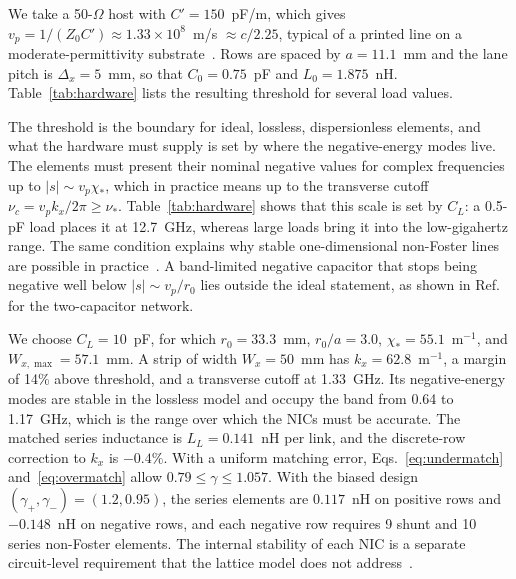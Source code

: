 \documentclass[aps,prapplied,twocolumn,superscriptaddress,floatfix,longbibliography]{revtex4-2}
\begin{document}
We take a 50-$\Omega$ host with $C'=150$~pF/m, which gives $v_p=1/(Z_0C')\approx1.33\times10^8$~m/s $\approx c/2.25$, typical of a printed line on a moderate-permittivity substrate~\cite{Pozar_2012:book}. Rows are spaced by $a=11.1$~mm and the lane pitch is $\Delta_x=5$~mm, so that $C_0=0.75$~pF and $L_0=1.875$~nH. Table~\ref{tab:hardware} lists the resulting threshold for several load values.

The threshold is the boundary for ideal, lossless, dispersionless elements, and what the hardware must supply is set by where the negative-energy modes live. The elements must present their nominal negative values for complex frequencies up to $|s|\sim v_p\chi_*$, which in practice means up to the transverse cutoff $\nu_c=v_pk_x/2\pi\ge\nu_*$. Table~\ref{tab:hardware} shows that this scale is set by $C_L$: a 0.5-pF load places it at 12.7~GHz, whereas large loads bring it into the low-gigahertz range. The same condition explains why stable one-dimensional non-Foster lines are possible in practice~\cite{Long_2014:TMTT,Long_2018:TMTT}. A band-limited negative capacitor that stops being negative well below $|s|\sim v_p/r_0$ lies outside the ideal statement, as shown in Ref.~\cite{Loncar_2017:TAP} for the two-capacitor network.

We choose $C_L=10$~pF, for which $r_0=33.3$~mm, $r_0/a=3.0$, $\chi_*=55.1$~m$^{-1}$, and $W_{x,\max}=57.1$~mm. A strip of width $W_x=50$~mm has $k_x=62.8$~m$^{-1}$, a margin of 14\% above threshold, and a transverse cutoff at 1.33~GHz. Its negative-energy modes are stable in the lossless model and occupy the band from 0.64 to 1.17~GHz, which is the range over which the NICs must be accurate. The matched series inductance is $L_L=0.141$~nH per link, and the discrete-row correction to $k_x$ is $-0.4\%$. With a uniform matching error, Eqs.~\eqref{eq:undermatch} and~\eqref{eq:overmatch} allow $0.79\le\gamma\le1.057$. With the biased design $(\gamma_+,\gamma_-)=(1.2,0.95)$, the series elements are $0.117$~nH on positive rows and $-0.148$~nH on negative rows, and each negative row requires 9 shunt and 10 series non-Foster elements. The internal stability of each NIC is a separate circuit-level requirement that the lattice model does not address~\cite{Suarez_2018:TMTT}.
\end{document}
